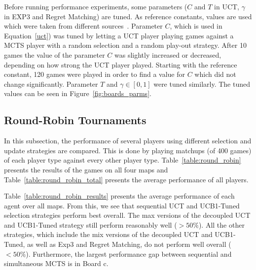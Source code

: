 \documentclass{article}
\begin{document}
Before running performance experiments, some parameters ($C$ and $T$ in UCT, $\gamma$ in EXP3 and Regret Matching) are tuned. 
As reference constants, values are used which were taken from different sources~\cite{teuling_tron,cig_paper}. Parameter $C$, which is used in Equation~\ref{uct}) was tuned by letting a UCT player playing games against a MCTS player with a random selection and a random play-out strategy. 
After 10 games the value of the parameter $C$ was slightly increased or decreased, depending on how strong the UCT player played. 
Starting with the reference constant, 120 games were played in order to find a value for $C$ which did not change significantly.
Parameter $T$ and $\gamma \in [0,1]$ were tuned similarly.
The tuned values can be seen in Figure~\ref{fig:boards_parms}.

\subsection{Round-Robin Tournaments}
\label{subsec:round_robin}
In this subsection, the performance of several players using different selection and update strategies are compared. 
This is done by playing matchups (of 400 games) of each player type against every other player type. 
Table~\ref{table:round_robin} presents the results of the games on all four maps and Table~\ref{table:round_robin_total} presents the average performance of all players.


Table~\ref{table:round_robin_results} presents the average performance of each agent over all maps. 
From this, we see that sequential UCT and UCB1-Tuned selection strategies perform best overall. 
The max versions of the decoupled UCT and UCB1-Tuned strategy still perform reasonably well ($>50\%$). 
All the other strategies, which include the mix versions of the decoupled UCT and UCB1-Tuned, as well as 
Exp3 and Regret Matching, do not perform well overall ($<50\%$).
Furthermore, the largest performance gap between sequential and simultaneous MCTS is in Board c. 
\end{document}
